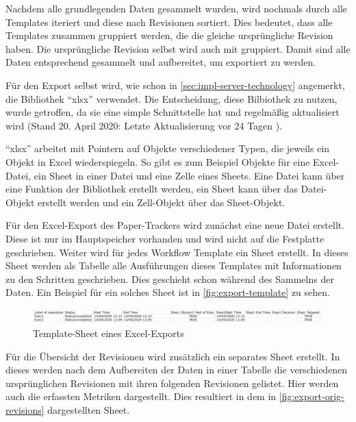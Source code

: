 Nachdem alle grundlegenden Daten gesammelt wurden, wird nochmals durch alle Templates iteriert und diese nach Revisionen sortiert.
Dies bedeutet, dass alle Templates zusammen gruppiert werden, die die gleiche ursprüngliche Revision haben.
Die ursprüngliche Revision selbst wird auch mit gruppiert.
Damit sind alle Daten entsprechend gesammelt und aufbereitet, um exportiert zu werden.

Für den Export selbst wird, wie schon in \autoref{sec:impl-server-technology} angemerkt, die Bibliothek \enquote{xlsx} verwendet.
Die Entscheidung, diese Bilbiothek zu nutzen, wurde getroffen, da sie eine simple Schnittstelle hat und regelmäßig aktualisiert wird
(Stand 20. April 2020: Letzte Aktualisierung vor 24 Tagen \cite{tealeg2020}).

\enquote{xlsx} arbeitet mit Pointern auf Objekte verschiedener Typen, die jeweils ein Objekt in Excel wiederspiegeln.
So gibt es zum Beispiel Objekte für eine Excel-Datei, ein Sheet in einer Datei und eine Zelle eines Sheets.
Eine Datei kann über eine Funktion der Bibliothek erstellt werden, ein Sheet kann über das Datei-Objekt erstellt werden
und ein Zell-Objekt über das Sheet-Objekt.

Für den Excel-Export des Paper-Trackers wird zunächst eine neue Datei erstellt.
Diese ist nur im Hauptspeicher vorhanden und wird nicht auf die Festplatte geschrieben.
Weiter wird für jedes Workflow Template ein Sheet erstellt.
In dieses Sheet werden als Tabelle alle Ausführungen dieses Templates mit Informationen zu den Schritten geschrieben.
Dies geschieht schon während des Sammelns der Daten.
Ein Beispiel für ein solches Sheet ist in \autoref{fig:export-template} zu sehen.

\begin{figure}[htbp]
	\includegraphics[width=\textwidth]{images/export_template.png}
	\centering
	\caption{Template-Sheet eines Excel-Exports}
	\label{fig:export-template}
\end{figure}

Für die Übersicht der Revisionen wird zusätzlich ein separates Sheet erstellt.
In dieses werden nach dem Aufbereiten der Daten in einer Tabelle die verschiedenen ursprünglichen Revisionen
mit ihren folgenden Revisionen gelistet.
Hier werden auch die erfassten Metriken dargestellt.
Dies resultiert in dem in \autoref{fig:export-orig-revisions} dargestellten Sheet.

